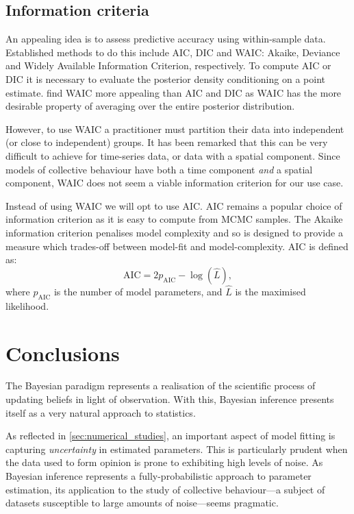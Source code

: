 \subsection{Information criteria}
\label{ssec:inf_cri}

An appealing idea is to assess predictive accuracy using within-sample data.
Established methods to do this include AIC, DIC and WAIC: Akaike, Deviance and
Widely Available Information Criterion, respectively. To compute AIC or DIC it
is necessary to evaluate the posterior density conditioning on a point
estimate. \textcite{gelman13} find WAIC more appealing than AIC and DIC as
WAIC has the more desirable property of averaging over the entire posterior
distribution.

However, to use WAIC a practitioner must partition their data into independent
(or close to independent) groups. It has been remarked that this can be very
difficult to achieve for time-series data, or data with a spatial component.
Since models of collective behaviour have both a time component \emph{and} a
spatial component, WAIC does not seem a viable information criterion for our
use case.

Instead of using WAIC we will opt to use AIC. AIC remains a popular choice of
information criterion as it is easy to compute from MCMC samples. The Akaike
information criterion penalises model complexity and so is designed to provide
a measure which trades-off between model-fit and model-complexity. AIC is
defined as:
\begin{equation}
\label{eq:aic}
\text{AIC} = 2p_{\text{AIC}} - \log(\widehat{L}),
\end{equation}
where $p_{\text{AIC}}$ is the number of model parameters, and $\widehat{L}$ is
the maximised likelihood.

\section*{Conclusions}

The Bayesian paradigm represents a realisation of the scientific process of
updating beliefs in light of observation. With this, Bayesian inference
presents itself as a very natural approach to statistics.

As reflected in \cref{sec:numerical_studies}, an important aspect of model
fitting is capturing \emph{uncertainty} in estimated parameters. This is
particularly prudent when the data used to form opinion is prone to exhibiting
high levels of noise. As Bayesian inference represents a fully-probabilistic
approach to parameter estimation, its application to the study of collective
behaviour---a subject of datasets susceptible to large amounts of noise---seems
pragmatic.

